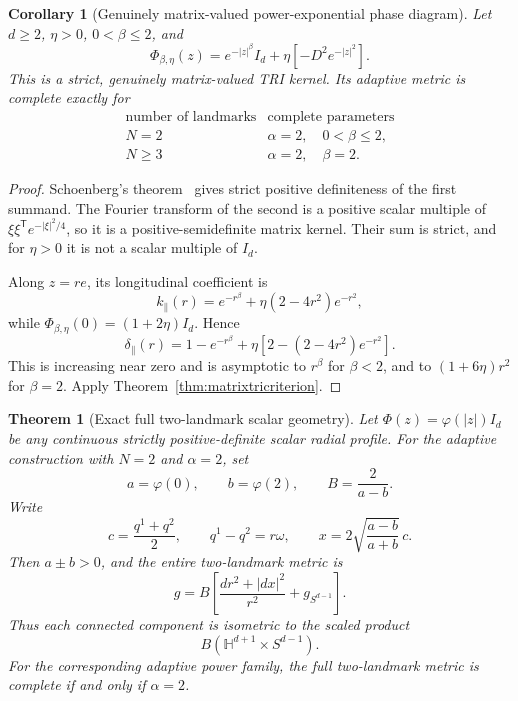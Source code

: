 \documentclass[11pt]{article}
\newtheorem{theorem}{Theorem}
\newtheorem{corollary}{Corollary}
\begin{document}
\begin{corollary}[Genuinely matrix-valued power-exponential phase diagram]
\label{cor:matrixstablephase}
Let \(d\ge2\), \(\eta>0\), \(0<\beta\le2\), and
\[
 \Phi_{\beta,\eta}(z)
 =e^{-|z|^\beta}I_d
  +\eta\left[-D^2e^{-|z|^2}\right].
\]
This is a strict, genuinely matrix-valued TRI kernel.  Its adaptive metric
is complete exactly for
\[
\begin{array}{c|c}
 \text{number of landmarks}&\text{complete parameters}\\ \hline
 N=2&\alpha=2,\quad 0<\beta\le2,\\
 N\ge3&\alpha=2,\quad \beta=2.
\end{array}
\]
\end{corollary}

\begin{proof}
Schoenberg's theorem~\cite{Schoenberg} gives strict positive definiteness of the first
summand.  The Fourier transform of the second is a positive scalar multiple
of
\(\xi\xi^{\mathsf T}e^{-|\xi|^2/4}\), so it is a positive-semidefinite
matrix kernel.  Their sum is strict, and for \(\eta>0\) it is not a scalar
multiple of \(I_d\).

Along \(z=re\), its longitudinal coefficient is
\[
 k_\parallel(r)
 =e^{-r^\beta}+\eta(2-4r^2)e^{-r^2},
\]
while \(\Phi_{\beta,\eta}(0)=(1+2\eta)I_d\).  Hence
\[
 \delta_\parallel(r)
 =1-e^{-r^\beta}
  +\eta\left[2-(2-4r^2)e^{-r^2}\right].
\]
This is increasing near zero and is asymptotic to \(r^\beta\) for
\(\beta<2\), and to \((1+6\eta)r^2\) for \(\beta=2\).  Apply
Theorem~\ref{thm:matrixtricriterion}.
\end{proof}

\begin{theorem}[Exact full two-landmark scalar geometry]
\label{thm:scalarproduct}
Let \(\Phi(z)=\varphi(|z|)I_d\) be any continuous strictly
positive-definite scalar radial profile.  For the adaptive construction with
\(N=2\) and \(\alpha=2\), set
\[
 a=\varphi(0),\qquad b=\varphi(2),\qquad
 B=\frac{2}{a-b}.
\]
Write
\[
 c=\frac{q^1+q^2}{2},\qquad
 q^1-q^2=r\omega,\qquad
 x=2\sqrt{\frac{a-b}{a+b}}\,c.
\]
Then \(a\pm b>0\), and the entire two-landmark metric is
\begin{equation}
 \boxed{\quad
 g=B\left[
 \frac{dr^2+|dx|^2}{r^2}+g_{S^{d-1}}
 \right].
 \quad}
 \label{eq:Hsphere}
\end{equation}
Thus each connected component is isometric to the scaled product
\[
 B\left(\mathbb H^{d+1}\times S^{d-1}\right).
\]
For the corresponding adaptive power family, the full two-landmark metric is
complete if and only if \(\alpha=2\).
\end{theorem}
\end{document}
